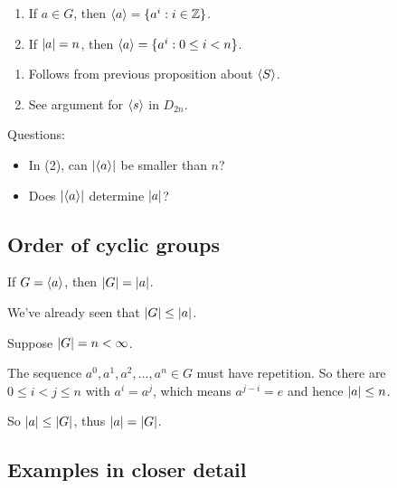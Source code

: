 \documentclass[12pt,letterpaper]{report}
\begin{document}
\begin{lem}{}{}
  \begin{enumerate}
    \item If $a \in G$, then $\langle a\rangle = \{ a^i : i \in \mathbb{Z} \}$.
    \item If $\lvert a\rvert = n$, then $\langle a\rangle = \{ a^i : 0 \leq i < n \}$.
  \end{enumerate}
\end{lem}

\begin{thmproof}
  \begin{enumerate}
    \item Follows from previous proposition about $\langle S\rangle$.
    \item See argument for $\langle s\rangle$ in $D_{2n}$.
  \end{enumerate}
\end{thmproof}

Questions:
\begin{itemize}
  \item In (2), can $\lvert\langle a\rangle\rvert$ be smaller than $n$?
  \item Does $\lvert\langle a\rangle\rvert$ determine $\lvert a\rvert$?
\end{itemize}

\pagebreak
\subsection{Order of cyclic groups}

\begin{prop}{}{}
  If $G = \langle a\rangle$, then $\lvert G\rvert = \lvert a\rvert$.
\end{prop}

\begin{thmproof}
  We've already seen that $\lvert G\rvert \leq \lvert a\rvert$.

  Suppose $\lvert G\rvert = n < \infty$.

  The sequence $a^0, a^1, a^2, \ldots, a^n \in G$ must have repetition.
  So there are $0 \leq i < j \leq n$ with $a^i = a^j$, which means $a^{j - i} = e$ and hence
  $\lvert a\rvert \leq n$.

  So $\lvert a\rvert \leq \lvert G\rvert$, thus $\lvert a\rvert = \lvert G\rvert$.
\end{thmproof}

\pagebreak
\subsection{Examples in closer detail}
\end{document}
